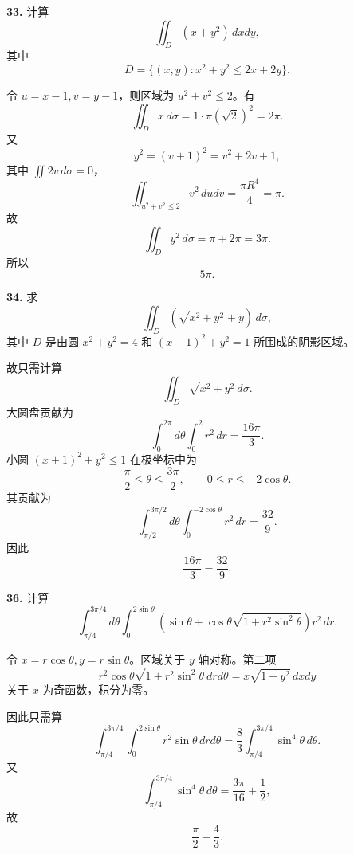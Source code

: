 \begin{problemblock}
\textbf{33.} 计算
\[
\iint_D(x+y^2)\,dxdy,
\]
其中
\[
D=\{(x,y):x^2+y^2\le2x+2y\}.
\]
\end{problemblock}

\begin{solutionblock}
令 \(u=x-1,v=y-1\)，则区域为 \(u^2+v^2\le2\)。有
\[
\iint_Dx\,d\sigma=1\cdot \pi(\sqrt2)^2=2\pi.
\]
又
\[
y^2=(v+1)^2=v^2+2v+1,
\]
其中 \(\iint 2v\,d\sigma=0\)，
\[
\iint_{u^2+v^2\le2}v^2\,dudv=\frac{\pi R^4}{4}=\pi.
\]
故
\[
\iint_Dy^2\,d\sigma=\pi+2\pi=3\pi.
\]
所以
\[
\boxed{5\pi}.
\]
\end{solutionblock}

\begin{problemblock}
\textbf{34.} 求
\[
\iint_D(\sqrt{x^2+y^2}+y)\,d\sigma,
\]
其中 \(D\) 是由圆 \(x^2+y^2=4\) 和 \((x+1)^2+y^2=1\) 所围成的阴影区域。
\end{problemblock}

\begin{solutionblock}
故只需计算
\[
\iint_D\sqrt{x^2+y^2}\,d\sigma.
\]
大圆盘贡献为
\[
\int_0^{2\pi}d\theta\int_0^2r^2\,dr=\frac{16\pi}{3}.
\]
小圆 \((x+1)^2+y^2\le1\) 在极坐标中为
\[
\frac{\pi}{2}\le\theta\le\frac{3\pi}{2},\qquad 0\le r\le-2\cos\theta.
\]
其贡献为
\[
\int_{\pi/2}^{3\pi/2}d\theta\int_0^{-2\cos\theta}r^2\,dr
=\frac{32}{9}.
\]
因此
\[
\boxed{\frac{16\pi}{3}-\frac{32}{9}}.
\]
\end{solutionblock}

\begin{problemblock}
\textbf{36.} 计算
\[
\int_{\pi/4}^{3\pi/4}d\theta\int_0^{2\sin\theta}
\left(\sin\theta+\cos\theta\sqrt{1+r^2\sin^2\theta}\right)r^2\,dr.
\]
\end{problemblock}

\begin{solutionblock}
令 \(x=r\cos\theta,y=r\sin\theta\)。区域关于 \(y\) 轴对称。第二项
\[
r^2\cos\theta\sqrt{1+r^2\sin^2\theta}\,drd\theta
=x\sqrt{1+y^2}\,dxdy
\]
关于 \(x\) 为奇函数，积分为零。

因此只需算
\[
\int_{\pi/4}^{3\pi/4}\int_0^{2\sin\theta}r^2\sin\theta\,drd\theta
=\frac83\int_{\pi/4}^{3\pi/4}\sin^4\theta\,d\theta.
\]
又
\[
\int_{\pi/4}^{3\pi/4}\sin^4\theta\,d\theta=\frac{3\pi}{16}+\frac12,
\]
故
\[
\boxed{\frac{\pi}{2}+\frac43}.
\]
\end{solutionblock}

